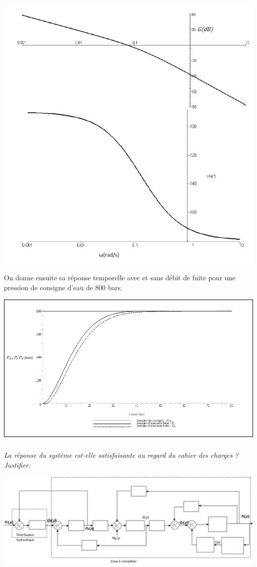 \documentclass[10pt,fleqn]{article} %
\begin{document}
\begin{multicols}{2}
\begin{center}
\includegraphics[width=\linewidth]{images_02/fig_08}
\end{center}

On donne ensuite sa réponse temporelle avec et sans débit de fuite pour une pression de consigne d’eau de 800 bars.


\begin{center}
\includegraphics[width=\linewidth]{images_02/fig_09}
\end{center}

\subparagraph{}
\textit{La réponse du système est-elle satisfaisante au regard du cahier des charges ? Justifier.}


\end{multicols}

\begin{center}
\includegraphics[width=.8\linewidth]{images_02/fig_10}
\end{center}
\end{document}
